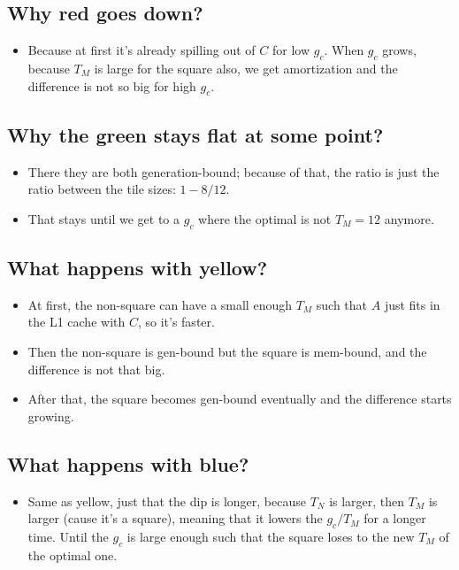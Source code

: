 \documentclass[11pt, a4paper]{article}
\begin{document}
\subsection*{Why red goes down?}
\begin{itemize}
    \item Because at first it's already spilling out of $C$ for low $g_c$. When $g_c$ grows, because $T_M$ is large for the square also, we get amortization and the difference is not so big for high $g_c$.
\end{itemize}

\subsection*{Why the green stays flat at some point?}
\begin{itemize}
    \item There they are both generation-bound; because of that, the ratio is just the ratio between the tile sizes: $1 - 8/12$.
    \item That stays until we get to a $g_c$ where the optimal is not $T_M = 12$ anymore.
\end{itemize}

\subsection*{What happens with yellow?}
\begin{itemize}
    \item At first, the non-square can have a small enough $T_M$ such that $A$ just fits in the L1 cache with $C$, so it's faster.
    \item Then the non-square is gen-bound but the square is mem-bound, and the difference is not that big.
    \item After that, the square becomes gen-bound eventually and the difference starts growing.
\end{itemize}

\subsection*{What happens with blue?}
\begin{itemize}
    \item Same as yellow, just that the dip is longer, because $T_N$ is larger, then $T_M$ is larger (cause it's a square), meaning that it lowers the $g_c / T_M$ for a longer time. Until the $g_c$ is large enough such that the square loses to the new $T_M$ of the optimal one.
\end{itemize}
\end{document}
